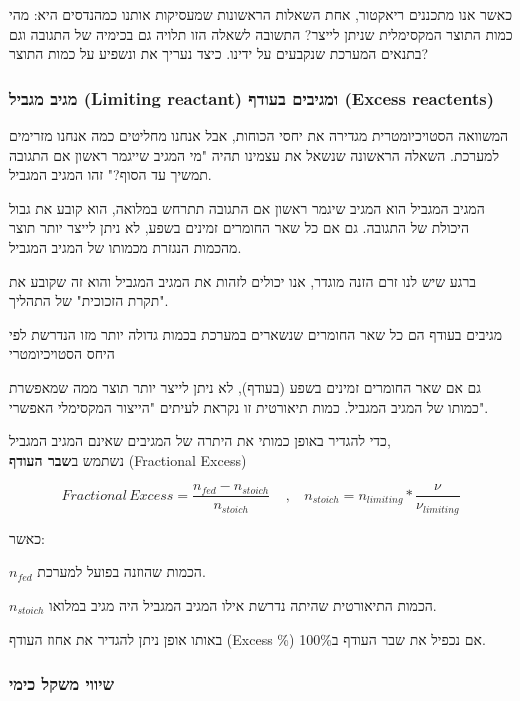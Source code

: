 \documentclass[
  hebrew,
  letterpaper,
  DIV=11,
  numbers=noendperiod]{scrreprt}
\begin{document}
כאשר אנו מתכננים ריאקטור, אחת השאלות הראשונות שמעסיקות אותנו כמהנדסים
היא: מהי כמות התוצר המקסימלית שניתן לייצר? התשובה לשאלה הזו תלויה גם
בכימיה של התגובה וגם בתנאים המערכת שנקבעים על ידינו. כיצד נעריך את
ונשפיע על כמות התוצר?

\subsubsection{מגיב מגביל (Limiting reactant) ומגיבים בעודף (Excess
reactents)}\label{ux5deux5d2ux5d9ux5d1-ux5deux5d2ux5d1ux5d9ux5dc-limiting-reactant-ux5d5ux5deux5d2ux5d9ux5d1ux5d9ux5dd-ux5d1ux5e2ux5d5ux5d3ux5e3-excess-reactents}

המשוואה הסטויכיומטרית מגדירה את יחסי הכוחות, אבל אנחנו מחליטים כמה אנחנו
מזרימים למערכת. השאלה הראשונה שנשאל את עצמינו תהיה "מי המגיב שייגמר
ראשון אם התגובה תמשיך עד הסוף?" זהו המגיב המגביל.

המגיב המגביל הוא המגיב שיגמר ראשון אם התגובה תתרחש במלואה, הוא קובע את
גבול היכולת של התגובה. גם אם כל שאר החומרים זמינים בשפע, לא ניתן לייצר
יותר תוצר מהכמות הנגזרת מכמותו של המגיב המגביל.

ברגע שיש לנו זרם הזנה מוגדר, אנו יכולים לזהות את המגיב המגביל והוא זה
שקובע את "תקרת הזכוכית" של התהליך.

מגיבים בעודף הם כל שאר החומרים שנשארים במערכת בכמות גדולה יותר מזו
הנדרשת לפי היחס הסטויכיומטרי

גם אם שאר החומרים זמינים בשפע (בעודף), לא ניתן לייצר יותר תוצר ממה
שמאפשרת כמותו של המגיב המגביל. כמות תיאורטית זו נקראת לעיתים "הייצור
המקסימלי האפשרי".

כדי להגדיר באופן כמותי את היתרה של המגיבים שאינם המגיב המגביל,\\
נשתמש ב\textbf{שבר העודף} (Fractional Excess)

\[Fractional\, Excess = \frac{n_{fed} - n_{stoich}}{n_{stoich}}\ \ \ \ \ ,\ \ \ \ n_{stoich} = n_{limiting}*\frac{\nu_{}}{\nu_{limiting}}\]

כאשר:

\(n_{fed}\) הכמות שהוזנה בפועל למערכת.

\(n_{stoich}\) הכמות התיאורטית שהיתה נדרשת אילו המגיב המגביל היה מגיב
במלואו.

באותו אופן ניתן להגדיר את אחוז העודף (Excess \%) אם נכפיל את שבר העודף
ב100\%.

\subsubsection{שיווי משקל
כימי}\label{ux5e9ux5d9ux5d5ux5d5ux5d9-ux5deux5e9ux5e7ux5dc-ux5dbux5d9ux5deux5d9}
\end{document}
